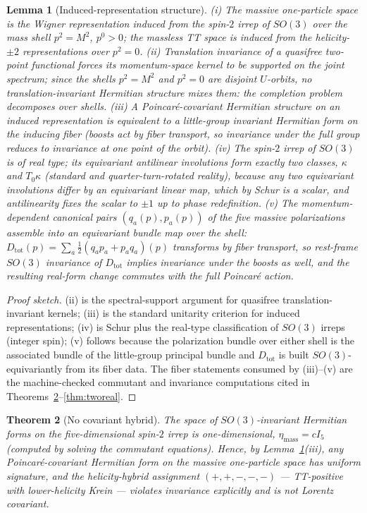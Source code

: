 \documentclass[11pt]{article}
\newtheorem{theorem}{Theorem}[section]
\newtheorem{lemma}[theorem]{Lemma}
\theoremstyle{definition}
\theoremstyle{remark}
\begin{document}
\begin{lemma}[Induced-representation structure]\label{lem:wigner}
(i) The massive one-particle space is the Wigner representation induced
from the spin-$2$ irrep of $SO(3)$ over the mass shell
$p^2=M^2$, $p^0>0$; the massless TT space is induced from the
helicity-$\pm2$ representations over $p^2=0$.
(ii) Translation invariance of a quasifree two-point functional forces
its momentum-space kernel to be supported on the joint spectrum; since
the shells $p^2=M^2$ and $p^2=0$ are disjoint $U$-orbits, no
translation-invariant Hermitian structure mixes them: the completion
problem decomposes over shells.
(iii) A Poincar\'e-covariant Hermitian structure on an induced
representation is equivalent to a little-group invariant Hermitian form
on the inducing fiber (boosts act by fiber transport, so invariance under
the full group reduces to invariance at one point of the orbit).
(iv) The spin-$2$ irrep of $SO(3)$ is of real type; its equivariant
antilinear involutions form exactly two classes, $\kappa$ and
$T_0\kappa$ (standard and quarter-turn-rotated reality), because any two
equivariant involutions differ by an equivariant linear map, which by
Schur is a scalar, and antilinearity fixes the scalar to $\pm1$ up to
phase redefinition.
(v) The momentum-dependent canonical pairs $(q_a(p),p_a(p))$ of the five
massive polarizations assemble into an equivariant bundle map over the
shell: $D_{\mathrm{tot}}(p)=\sum_a\tfrac12(q_ap_a+p_aq_a)(p)$ transforms
by fiber transport, so rest-frame $SO(3)$ invariance of
$D_{\mathrm{tot}}$ implies invariance under the boosts as well, and the
resulting real-form change commutes with the full Poincar\'e action.
\end{lemma}

\begin{proof}[Proof sketch]
(ii) is the spectral-support argument for quasifree translation-invariant
kernels; (iii) is the standard unitarity criterion for induced
representations; (iv) is Schur plus the real-type classification of
$SO(3)$ irreps (integer spin); (v) follows because the polarization
bundle over either shell is the associated bundle of the little-group
principal bundle and $D_{\mathrm{tot}}$ is built $SO(3)$-equivariantly
from its fiber data.  The fiber statements consumed by (iii)--(v) are the
machine-checked commutant and invariance computations cited in
Theorems~\ref{thm:nohybrid}--\ref{thm:tworeal}.
\end{proof}

\begin{theorem}[No covariant hybrid]\label{thm:nohybrid}
The space of $SO(3)$-invariant Hermitian forms on the five-dimensional
spin-$2$ irrep is one-dimensional, $\eta_{\mathrm{mass}}=cI_5$ (computed
by solving the commutant equations).  Hence, by
Lemma~\ref{lem:wigner}(iii), any Poincar\'e-covariant Hermitian form on
the massive one-particle space has uniform signature, and the
helicity-hybrid assignment $(+,+,-,-,-)$ --- TT-positive with
lower-helicity Krein --- violates invariance explicitly and is not
Lorentz covariant.
\end{theorem}
\end{document}
